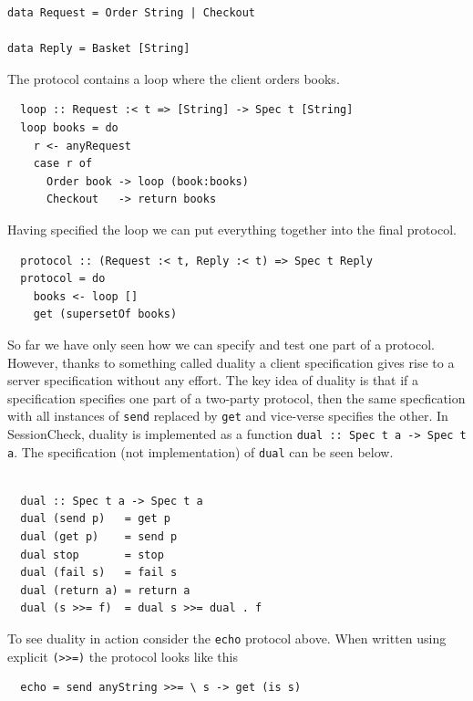 \documentclass{article}
\begin{document}
\begin{verbatim}
data Request = Order String | Checkout

data Reply = Basket [String]
\end{verbatim}

The protocol contains a loop where the client orders books.

\begin{verbatim}
  loop :: Request :< t => [String] -> Spec t [String]
  loop books = do
    r <- anyRequest
    case r of
      Order book -> loop (book:books)
      Checkout   -> return books
\end{verbatim}

Having specified the loop we can put everything together into the final protocol.

\begin{verbatim}
  protocol :: (Request :< t, Reply :< t) => Spec t Reply
  protocol = do
    books <- loop []
    get (supersetOf books)
\end{verbatim}

So far we have only seen how we can specify and test one part of a protocol.
%
However, thanks to something called duality a client specification gives rise
to a server specification without any effort.
%
The key idea of duality is that if a specification specifies one part of a two-party
protocol, then the same specfication with all instances of \texttt{send} replaced by
\texttt{get} and vice-verse specifies the other.
%
In SessionCheck, duality is implemented as a function \texttt{dual :: Spec t a -> Spec t a}.
%
The specification (not implementation) of \texttt{dual} can be seen below.
\\~\\

\begin{minipage}{\linewidth}
\begin{verbatim}
  dual :: Spec t a -> Spec t a
  dual (send p)   = get p
  dual (get p)    = send p
  dual stop       = stop
  dual (fail s)   = fail s
  dual (return a) = return a
  dual (s >>= f)  = dual s >>= dual . f
\end{verbatim}
\end{minipage}

To see duality in action consider the \texttt{echo} protocol above.
%
When written using explicit \texttt{(>>=)} the protocol looks like this

\begin{verbatim}
  echo = send anyString >>= \ s -> get (is s)
\end{verbatim}
\end{document}
